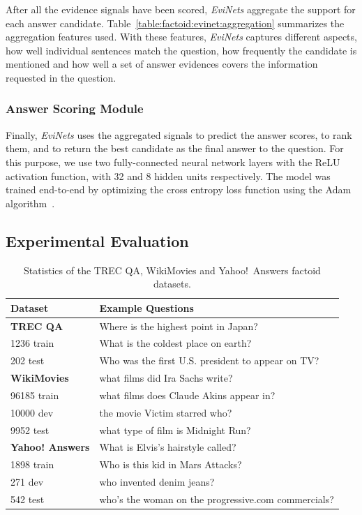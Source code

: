 After all the evidence signals have been scored, \textit{EviNets} aggregate the support for each answer candidate.
Table~\ref{table:factoid:evinet:aggregation} summarizes the aggregation features used.
With these features, \textit{EviNets} captures different aspects, \ie how well individual sentences match the question, how frequently the candidate is mentioned and how well a set of answer evidences covers the information requested in the question.

\subsubsection{Answer Scoring Module}

Finally, \textit{EviNets} uses the aggregated signals to predict the answer scores, to rank them, and to return the best candidate as the final answer to the question.
For this purpose, we use two fully-connected neural network layers with the ReLU activation function, with 32 and 8 hidden units respectively.
The model was trained end-to-end by optimizing the cross entropy loss function using the Adam algorithm~\cite{kingma2014adam}.

\subsection{Experimental Evaluation}
\label{section:factoid:evinet:eval}

\begin{table}
\small
\centering
\begin{tabular}{lp{9cm}}
Dataset & Example Questions \\
\hline
\textbf{TREC QA} & Where is the highest point in Japan? \\
1236 train & What is the coldest place on earth? \\
202 test & Who was the first U.S. president to appear on TV?\\
\hline
\textbf{WikiMovies} & what films did Ira Sachs write? \\
96185 train & what films does Claude Akins appear in? \\
10000 dev & the movie Victim starred who? \\
9952 test & what type of film is Midnight Run? \\
\hline
\textbf{Yahoo! Answers} & What is Elvis's hairstyle called? \\
1898 train & Who is this kid in Mars Attacks? \\
271 dev & who invented denim jeans? \\
542 test & who's the woman on the progressive.com commercials? \\
\end{tabular}
\caption{Statistics of the TREC QA, WikiMovies and Yahoo!~Answers factoid datasets.}
\label{table:factoid:evinet:datasets}
\end{table}


